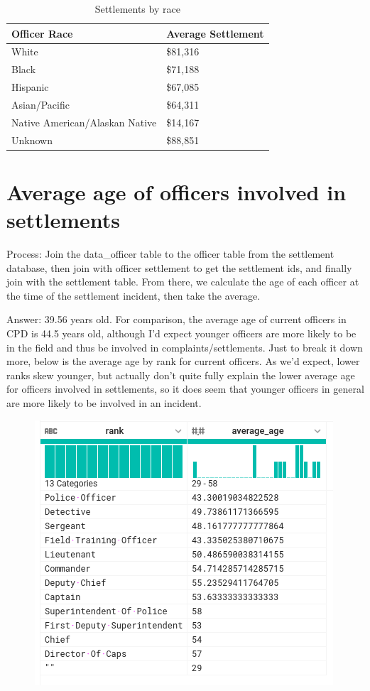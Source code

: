 \documentclass{article}
\begin{document}
\begin{table}[h!]
\centering
\caption{Settlements by race}
\label{table3}
\begin{tabular}{|l|l|}
\hline
Officer Race	& Average Settlement\\
\hline
White                          & \$81,316  \\
Black                          & \$71,188  \\
Hispanic                       & \$67,085 \\
Asian/Pacific                  & \$64,311  \\
Native American/Alaskan Native & \$14,167  \\
Unknown                        & \$88,851 \\
\hline
\end{tabular}
\end{table}

\pagebreak

\section{Average age of officers involved in settlements}
Process: Join the data\_officer table to the officer table from the settlement database, then join with officer settlement to get the settlement ids, and finally join with the settlement table. From there, we calculate the age of each officer at the time of the settlement incident, then take the average.

Answer: 39.56 years old. For comparison, the average age of current officers in CPD is 44.5 years old, although I’d expect younger officers are more likely to be in the field and thus be involved in complaints/settlements. Just to break it down more, below is the average age by rank for current officers. As we'd expect, lower ranks skew younger, but actually don't quite fully explain the lower average age for officers involved in settlements, so it does seem that younger officers in general are more likely to be involved in an incident.

\begin{figure}[h!]
\centering
\includegraphics[scale=0.5]{ages.png}
\end{figure}
\end{document}
